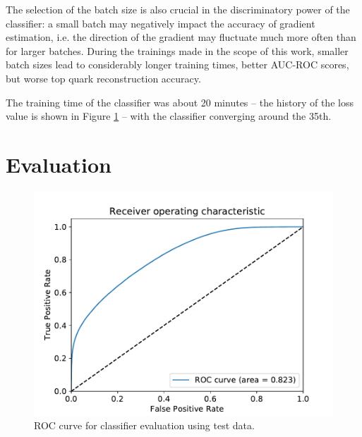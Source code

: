 The selection of the batch size is also crucial in the discriminatory power of the classifier: a small batch may negatively impact the accuracy of gradient estimation, i.e. the direction of the gradient may fluctuate much more often than for larger batches. During the trainings made in the scope of this work, smaller batch sizes lead to considerably longer training times, better AUC-ROC scores, but worse top quark reconstruction accuracy.

The training time of the classifier was about 20 minutes -- the history of the loss value is shown in Figure \ref{fig:ch_4_loss} -- with the classifier converging around the 35th.

\section{Evaluation}

\begin{figure}[h]
    \centering
    \includegraphics[scale=.75]{assets/chap04/roc_test.pdf}
    \caption{ROC curve for classifier evaluation using test data.}
    \label{fig:ch_4_loss}
\end{figure}

\label{sec:ch-5-eval}